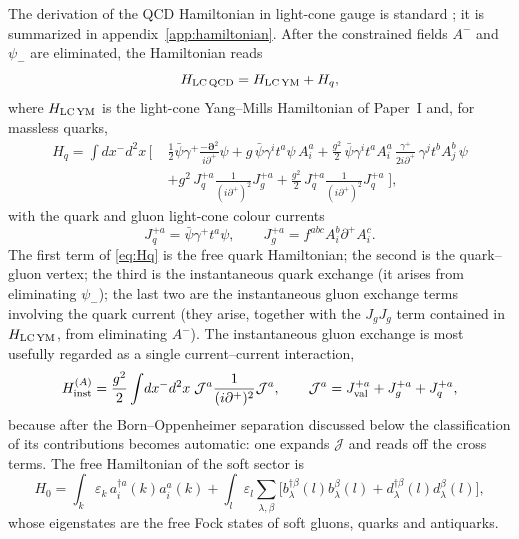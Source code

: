 \documentclass[11pt,a4paper]{article}
\numberwithin{equation}{section}
\newcommand{\eps}{\varepsilon}
\newcommand{\dg}{\dagger}
\newcommand{\Jc}{\mathcal{J}}
\begin{document}
The derivation of the QCD Hamiltonian in light-cone gauge is standard
\cite{Brodsky:1997de,Zhang:1993dd,Kogut:1969xa,Lublinsky:2016meo}; it is summarized in
appendix~\ref{app:hamiltonian}. After the constrained fields $A^{-}$ and $\psi_{-}$ are eliminated,
the Hamiltonian reads
\begin{equation}
H_{\rm LC\,QCD}=H_{\rm LC\,YM}+H_{q},
\label{eq:HQCD}
\end{equation}
where $H_{\rm LC\,YM}$ is the light-cone Yang--Mills Hamiltonian of Paper~I and, for massless
quarks,
\begin{align}
H_{q}=\int\!dx^{-}d^{2}x\,\Big[\;&\frac{1}{2}\bar\psi\gamma^{+}\frac{-\bm\partial^{2}}{i\partial^{+}}\psi
+g\,\bar\psi\gamma^{i}t^{a}\psi\,A^{a}_{i}
+\frac{g^{2}}{2}\,\bar\psi\gamma^{i}t^{a}A^{a}_{i}\,\frac{\gamma^{+}}{2i\partial^{+}}\,
\gamma^{j}t^{b}A^{b}_{j}\,\psi
\nonumber\\
&+g^{2}\,J^{+a}_{q}\frac{1}{(i\partial^{+})^{2}}J^{+a}_{g}
+\frac{g^{2}}{2}\,J^{+a}_{q}\frac{1}{(i\partial^{+})^{2}}J^{+a}_{q}\;\Big],
\label{eq:Hq}
\end{align}
with the quark and gluon light-cone colour currents
\begin{equation}
J^{+a}_{q}=\bar\psi\gamma^{+}t^{a}\psi,\qquad J^{+a}_{g}=f^{abc}A^{b}_{i}\partial^{+}A^{c}_{i}.
\label{eq:currents}
\end{equation}
The first term of \eqref{eq:Hq} is the free quark Hamiltonian; the second is the quark--gluon
vertex; the third is the instantaneous quark exchange (it arises from eliminating $\psi_{-}$);
the last two are the instantaneous gluon exchange terms involving the quark current (they
arise, together with the $J_{g}J_{g}$ term contained in $H_{\rm LC\,YM}$, from eliminating
$A^{-}$). The instantaneous gluon exchange is most usefully regarded as a single current--current
interaction,
\begin{equation}
H^{(A)}_{\rm inst}=\frac{g^{2}}{2}\int\!dx^{-}d^{2}x\;\Jc^{a}\frac{1}{(i\partial^{+})^{2}}\Jc^{a},
\qquad \Jc^{a}=J^{+a}_{\rm val}+J^{+a}_{g}+J^{+a}_{q},
\label{eq:HinstA}
\end{equation}
because after the Born--Oppenheimer separation discussed below the classification of its
contributions becomes automatic: one expands $\Jc$ and reads off the cross terms. The free
Hamiltonian of the soft sector is
\begin{equation}
H_{0}=\int_{k}\eps_{k}\,a^{\dg a}_{i}(k)a^{a}_{i}(k)
+\int_{l}\eps_{l}\sum_{\lambda,\beta}\Big[b^{\dg\beta}_{\lambda}(l)b^{\beta}_{\lambda}(l)
+d^{\dg\beta}_{\lambda}(l)d^{\beta}_{\lambda}(l)\Big],
\label{eq:H0}
\end{equation}
whose eigenstates are the free Fock states of soft gluons, quarks and antiquarks.
\end{document}
